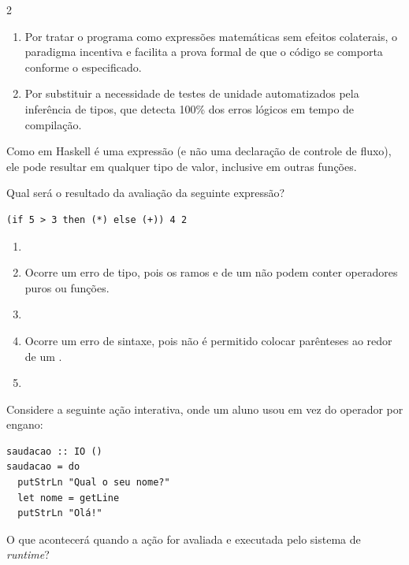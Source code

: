 \documentclass[a4paper,10pt,brazil]{article}
\begin{document}
\begin{multicols}{2}
\begin{enumerate}
  \item Por tratar o programa como expressões matemáticas sem efeitos colaterais, o paradigma incentiva e facilita a prova formal de que o código se comporta conforme o especificado.

  \item Por substituir a necessidade de testes de unidade automatizados pela inferência de tipos, que detecta 100\% dos erros lógicos em tempo de compilação.


\end{enumerate}

Como  em Haskell é uma expressão (e não uma declaração de controle de fluxo), ele pode resultar em qualquer tipo de valor, inclusive em outras funções. 

Qual será o resultado da avaliação da seguinte expressão?
\begin{verbatim}
(if 5 > 3 then (*) else (+)) 4 2
\end{verbatim}

\begin{enumerate}
  \item {}

  \item Ocorre um erro de tipo, pois os ramos  e  de um  não podem conter operadores puros ou funções.

  \item {}

  \item Ocorre um erro de sintaxe, pois não é permitido colocar parênteses ao redor de um .

  \item {}


\end{enumerate}

Considere a seguinte ação interativa, onde um aluno usou  em vez do operador \haskellinline{<-} por engano:

\begin{verbatim}
saudacao :: IO ()
saudacao = do
  putStrLn "Qual o seu nome?"
  let nome = getLine
  putStrLn "Olá!"
\end{verbatim}

O que acontecerá quando a ação  for avaliada e executada pelo sistema de \emph{runtime}?


\end{multicols}
\end{document}
